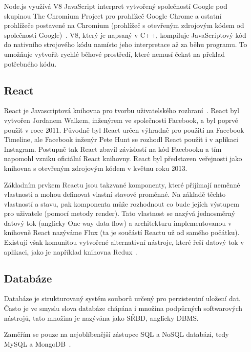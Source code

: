 Node.js využívá V8 JavaScript interpret vytvořený společností Google pod skupinou The Chromium Project pro prohlížeč Google Chrome a ostatní prohlížeče postavené na Chromium (prohlížeč s otevřeným zdrojovým kódem od společnosti Google)~\cite{node:es6}.
V8, který je napsaný v C++, kompiluje JavaScriptový kód do nativního strojového kódu namísto jeho interpretace až za běhu programu.
To umožňuje vytvořit rychlé běhové prostředí, které nemusí čekat na překlad potřebného kódu.~\cite{node:article2013}

\subsection{React}\label{subsec:reactjs}

React je Javascriptová knihovna pro tvorbu uživatelského rozhraní~\cite{react:about}.
React byl vytvořen Jordanem Walkem, inženýrem ve společnosti Facebook, a byl poprvé použit v roce 2011.
Původně byl React určen výhradně pro použití na Facebook Timeline, ale Facebook inženýr Pete Hunt se rozhodl React použít i v aplikaci Instagram.
Postupně tak React zbavil závislostí na kód Facebooku a tím napomohl vzniku oficiální React knihovny.
React byl představen veřejnosti jako knihovna s otevřeným zdrojovým kódem v květnu roku 2013.~\cite{react:author}

Základním prvkem Reactu jsou takzvané komponenty, které přijímají neměnné vlastnosti a mohou definovat vlastní stavové proměnné.
Na základě těchto vlastností a stavu, pak komponenta může rozhodnout co bude jejích výstupem pro uživatele (pomocí metody render).
Tato vlastnost se nazývá jednosměrný datový tok (anglicky One-way data flow) a architekturu implementovanou v knihovně React nazýváme Flux (ta je součástí Reactu už od samého počátku).~\cite{react:about}
Existují však komunitou vytvořené alternativní nástroje, které řeší datový tok v aplikaci, jako je například knihovna Redux~\cite{react:redux}.

\subsection{Databáze}\label{subsec:databáze}
Databáze je strukturovaný systém souborů určený pro perzistentní uložení dat.
Často je ve smyslu slova databáze chápána i množina podpůrných softwarových nástrojů, tato množina je nazývána jako \gls{SŘBD}, anglicky \gls{DBMS}.

Zaměřím se pouze na nejoblíbenější zástupce \gls{SQL} a \gls{NoSQL} databázi, tedy MySQL a MongoDB~\cite{mongo:popularity}.

